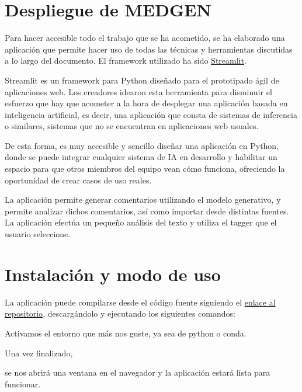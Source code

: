 \section{Despliegue de MEDGEN}

Para hacer accesible todo el trabajo que se ha acometido, se ha elaborado una aplicación que permite hacer uso de todas las técnicas y herramientas discutidas a lo largo del documento. El framework utilizado ha sido \href{https://streamlit.io}{Streamlit}.

Streamlit es un framework para Python diseñado para el prototipado ágil de aplicaciones web. Los creadores idearon esta herramienta para disminuir el esfuerzo que hay que acometer a la hora de desplegar una aplicación basada en inteligencia artificial, es decir, una aplicación que consta de sistemas de inferencia o similares, sistemas que no se encuentran en aplicaciones web usuales. 

De esta forma, es muy accesible y sencillo diseñar una aplicación en Python, donde se puede integrar cualquier sistema de IA en desarrollo y habilitar un espacio para que otros miembros del equipo vean cómo funciona, ofreciendo la oportunidad de crear casos de uso reales.

La aplicación permite generar comentarios utilizando el modelo generativo, y permite analizar dichos comentarios, así como importar desde distintas fuentes. La aplicación efectúa un pequeño análisis del texto y utiliza el tagger que el usuario seleccione.


\section{Instalación y modo de uso}
La aplicación puede compilarse desde el código fuente siguiendo el \href{https://github.com/jesi-rgb/medical-text-analysis}{enlace al repositorio}, descargándolo y ejecutando los siguientes comandos:


Activamos el entorno que más nos guste, ya sea de python o conda.



Una vez finalizado, 


se nos abrirá una ventana en el navegador y la aplicación estará lista para funcionar.

